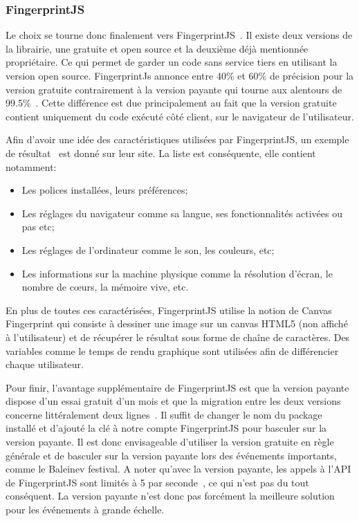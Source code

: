 \subsubsection{FingerprintJS}
Le choix se tourne donc finalement vers FingerprintJS~\cite{fingerprintjs}. Il existe deux versions de la librairie, une gratuite et open source et la deuxième déjà mentionnée propriétaire. Ce qui permet de garder un code sans service tiers en utilisant la version open source. FingerprintJs annonce entre 40\% et 60\% de précision pour la version gratuite contrairement à la version payante qui tourne aux alentours de 99.5\%~\cite{fingerprintjsrepo}. Cette différence est due principalement au fait que la version gratuite contient uniquement du code exécuté côté client, sur le navigateur de l'utilisateur.

Afin d'avoir une idée des caractéristiques utilisées par FingerprintJS, un exemple de résultat~\cite{fingerprintjs-example} est donné sur leur site. La liste est conséquente, elle contient notamment:

\begin{itemize}
  \item Les polices installées, leurs préférences;
  \item Les réglages du navigateur comme sa langue, ses fonctionnalités activées ou pas etc;
  \item Les réglages de l'ordinateur comme le son, les couleurs, etc;
  \item Les informations sur la machine physique comme la résolution d'écran, le nombre de c\oe{}urs, la mémoire vive, etc.
\end{itemize}

En plus de toutes ces caractérisées, FingerprintJS utilise la notion de Canvas Fingerprint qui consiste à dessiner une image sur un canvas HTML5 (non affiché à l'utilisateur) et de récupérer le résultat sous forme de chaîne de caractères. Des variables comme le temps de rendu graphique sont utilisées afin de différencier chaque utilisateur.

Pour finir, l'avantage supplémentaire de FingerprintJS est que la version payante dispose d'un essai gratuit d'un mois et que la migration entre les deux versions concerne littéralement deux lignes~\cite{migratefingerprintjs}. Il suffit de changer le nom du package installé et d'ajouté la clé à notre compte FingerprintJS pour basculer sur la version payante. Il est donc envisageable d'utiliser la version gratuite en règle générale et de basculer sur la version payante lors des événements importants, comme le Baleinev festival. A noter qu'avec la version payante, les appels à l'API de FingerprintJS sont limités à 5 par seconde~\cite{fingerprintjs-limits}, ce qui n'est pas du tout conséquent. La version payante n'est donc pas forcément la meilleure solution pour les événements à grande échelle.

